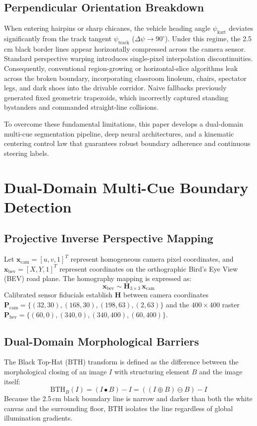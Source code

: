 \documentclass[10pt,journal,compsoc]{IEEEtran}
\begin{document}
\subsection{Perpendicular Orientation Breakdown}
When entering hairpins or sharp chicanes, the vehicle heading angle $\psi_{\text{kart}}$ deviates significantly from the track tangent $\psi_{\text{track}}$ ($\Delta \psi \to 90^\circ$). Under this regime, the 2.5\,cm black border lines appear horizontally compressed across the camera sensor. Standard perspective warping introduces single-pixel interpolation discontinuities. Consequently, conventional region-growing or horizontal-slice algorithms leak across the broken boundary, incorporating classroom linoleum, chairs, spectator legs, and dark shoes into the drivable corridor. Naive fallbacks previously generated fixed geometric trapezoids, which incorrectly captured standing bystanders and commanded straight-line collisions.

To overcome these fundamental limitations, this paper develops a dual-domain multi-cue segmentation pipeline, deep neural architectures, and a kinematic centering control law that guarantees robust boundary adherence and continuous steering labels.

\section{Dual-Domain Multi-Cue Boundary Detection}

\subsection{Projective Inverse Perspective Mapping}
Let $\mathbf{x}_{\text{cam}} = [u, v, 1]^T$ represent homogeneous camera pixel coordinates, and $\mathbf{x}_{\text{bev}} = [X, Y, 1]^T$ represent coordinates on the orthographic Bird's Eye View (BEV) road plane. The homography mapping is expressed as:
\begin{equation}
\mathbf{x}_{\text{bev}} \sim \mathbf{H}_{3 \times 3} \, \mathbf{x}_{\text{cam}}
\end{equation}
Calibrated sensor fiducials establish $\mathbf{H}$ between camera coordinates $\mathbf{P}_{\text{cam}} = \{(32, 30), (168, 30), (198, 63), (2, 63)\}$ and the $400 \times 400$ raster $\mathbf{P}_{\text{bev}} = \{(60, 0), (340, 0), (340, 400), (60, 400)\}$.

\subsection{Dual-Domain Morphological Barriers}
The Black Top-Hat ($\text{BTH}$) transform is defined as the difference between the morphological closing of an image $I$ with structuring element $B$ and the image itself:
\begin{equation}
\text{BTH}_B(I) = (I \bullet B) - I = ((I \oplus B) \ominus B) - I
\end{equation}
Because the 2.5\,cm black boundary line is narrow and darker than both the white canvas and the surrounding floor, $\text{BTH}$ isolates the line regardless of global illumination gradients.
\end{document}
